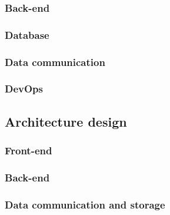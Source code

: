 \documentclass{article}
\begin{document}
            \subsubsection{Back-end}
                        
            \subsubsection{Database}
            
            \subsubsection{Data communication}
                        
            \subsubsection{DevOps}
            
            \pagebreak
    \subsection{Architecture design} %
    
    \pagebreak
        \subsubsection{Front-end}
        
        \pagebreak
        \subsubsection{Back-end}
        
        \pagebreak
        \subsubsection{Data communication and storage}
        
        \pagebreak
\end{document}

